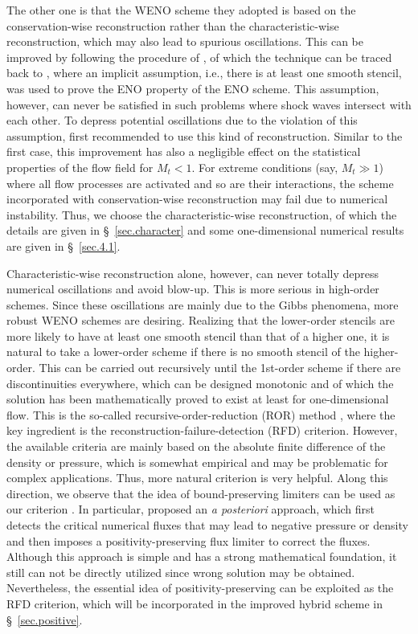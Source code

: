 \documentclass[review]{elsarticle}
\begin{document}
The other one is that the WENO scheme they adopted is based on the conservation-wise reconstruction rather than the characteristic-wise reconstruction, which may also lead to spurious oscillations. This can be improved by following the procedure of \citet{Ren2003}, of which the technique can be traced back to \citet{Harten1986}, where an implicit assumption, i.e., there is at least one smooth stencil, was used to prove the ENO property of the ENO scheme. This assumption, however, can never be satisfied in such problems where shock waves intersect with each other. To depress potential oscillations due to the violation of this assumption, \citet{Harten1987} first recommended to use this kind of reconstruction. Similar to the first case, this improvement has also a negligible effect on the statistical properties of the flow field for $M_t < 1$. For extreme conditions (say, $M_t \gg 1$) where all flow processes are activated and so are their interactions, the scheme incorporated with conservation-wise reconstruction may fail due to numerical instability. Thus, we choose the characteristic-wise reconstruction, of which the details are given in \S~\ref{sec.character} and some one-dimensional numerical results are given in \S~\ref{sec.4.1}.

Characteristic-wise reconstruction alone, however, can never totally depress numerical oscillations and avoid blow-up. This is more serious in high-order schemes. Since these oscillations are mainly due to the Gibbs phenomena, more robust WENO schemes are desiring. Realizing that the lower-order stencils are more likely to have at least one smooth stencil than that of a higher one, it is natural to take a lower-order scheme if there is no smooth stencil of the higher-order. This can be carried out recursively until the 1st-order scheme if there are discontinuities everywhere, which can be designed monotonic and of which the solution has been mathematically proved to exist at least for one-dimensional flow. This is the so-called recursive-order-reduction (ROR) method \citep{Titarev2004, Gerolymos2009}, where the key ingredient is the reconstruction-failure-detection (RFD) criterion. However, the available criteria are mainly based on the absolute finite difference of the density or pressure, which is somewhat empirical and may be problematic for complex applications. Thus, more natural criterion is very helpful. Along this direction, we observe that the idea of bound-preserving limiters can be used as our criterion \citep{Shu2016}. In particular, \citet{Hu2013} proposed an \textit{a posteriori} approach, which first detects the critical numerical fluxes that may lead to negative pressure or density and then imposes a positivity-preserving flux limiter to correct the fluxes. Although this approach is simple and has a strong mathematical foundation, it still can not be directly utilized since wrong solution may be obtained. Nevertheless, the essential idea of positivity-preserving can be exploited as the RFD criterion, which will be incorporated in the improved hybrid scheme in \S~\ref{sec.positive}.
\end{document}
